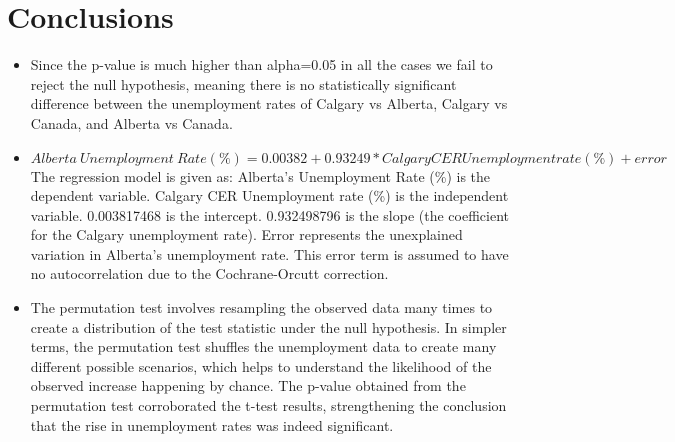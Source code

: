 \documentclass[11pt]{article}
\begin{document}
\section{Conclusions}
\begin{itemize}
    \item Since the p-value is much higher than alpha=0.05 in all the cases we fail to reject the null hypothesis, meaning there is no statistically significant difference between the unemployment rates of Calgary vs Alberta, Calgary vs Canada, and Alberta vs Canada.
    \item $Alberta\ Unemployment\ Rate (\%) = 0.00382 + 0.93249 * Calgary CER Unemployment rate (\%)  + error$
The regression model is given as:
Alberta's Unemployment Rate (\%) is the dependent variable.
Calgary CER Unemployment rate (\%) is the independent variable.
0.003817468 is the intercept.
0.932498796 is the slope (the coefficient for the Calgary unemployment rate).
Error represents the unexplained variation in Alberta's unemployment rate. This error term is assumed to have no autocorrelation due to the Cochrane-Orcutt correction.

\item The permutation test involves resampling the observed data many times to create a distribution of the test statistic under the null hypothesis. In simpler terms, the permutation test shuffles the unemployment data to create many different possible scenarios, which helps to understand the likelihood of the observed increase happening by chance. The p-value obtained from the permutation test corroborated the t-test results, strengthening the conclusion that the rise in unemployment rates was indeed significant.
\end{itemize}


\printbibliography 
\end{document}
